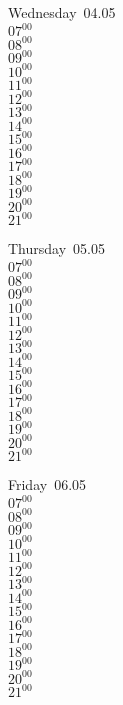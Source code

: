 \documentclass[11pt,a4paper]{book}\usepackage[]{graphicx}\usepackage[]{color}
\begin{document}
\begin{weekdaybox}
  Wednesday~04.05\\
  { 
  \vfill
  $07^{00}$\\
$08^{00}$\\
$09^{00}$\\
$10^{00}$\\
$11^{00}$\\
$12^{00}$\\
$13^{00}$\\
$14^{00}$\\
$15^{00}$\\
$16^{00}$\\
$17^{00}$\\
$18^{00}$\\
$19^{00}$\\
$20^{00}$\\
$21^{00}$\\
  }
\end{weekdaybox}
\clearpage
\begin{headerbox}
\end{headerbox}
\begin{weekdaybox}
  Thursday~05.05\\
  { 
  \vfill
  $07^{00}$\\
$08^{00}$\\
$09^{00}$\\
$10^{00}$\\
$11^{00}$\\
$12^{00}$\\
$13^{00}$\\
$14^{00}$\\
$15^{00}$\\
$16^{00}$\\
$17^{00}$\\
$18^{00}$\\
$19^{00}$\\
$20^{00}$\\
$21^{00}$\\
  }
\end{weekdaybox} 
\begin{weekdaybox}
  Friday~06.05\\
  { 
  \vfill
  $07^{00}$\\
$08^{00}$\\
$09^{00}$\\
$10^{00}$\\
$11^{00}$\\
$12^{00}$\\
$13^{00}$\\
$14^{00}$\\
$15^{00}$\\
$16^{00}$\\
$17^{00}$\\
$18^{00}$\\
$19^{00}$\\
$20^{00}$\\
$21^{00}$\\
  }
\end{weekdaybox}
\end{document}
